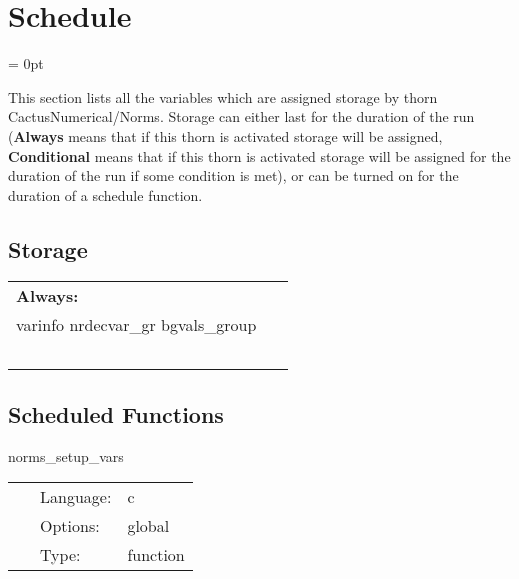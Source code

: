 
\section{Schedule} 


\parskip = 0pt


\noindent This section lists all the variables which are assigned storage by thorn CactusNumerical/Norms.  Storage can either last for the duration of the run ({\bf Always} means that if this thorn is activated storage will be assigned, {\bf Conditional} means that if this thorn is activated storage will be assigned for the duration of the run if some condition is met), or can be turned on for the duration of a schedule function.


\subsection*{Storage}

\hspace{5mm}

 \begin{tabular*}{160mm}{ll} 

{\bf Always:}&  ~ \\ 
 varinfo nrdecvar\_gr bgvals\_group & ~\\ 
~ & ~\\ 
\end{tabular*} 


\subsection*{Scheduled Functions}
\vspace{5mm}


\hspace{5mm} norms\_setup\_vars 

\hspace{5mm}{\it check norm\_type and setup the vars info } 


\hspace{5mm}

 \begin{tabular*}{160mm}{cll} 
~ & Language:  & c \\ 
~ & Options:  & global \\ 
~ & Type:  & function \\ 
\end{tabular*} 


\vspace{5mm}

